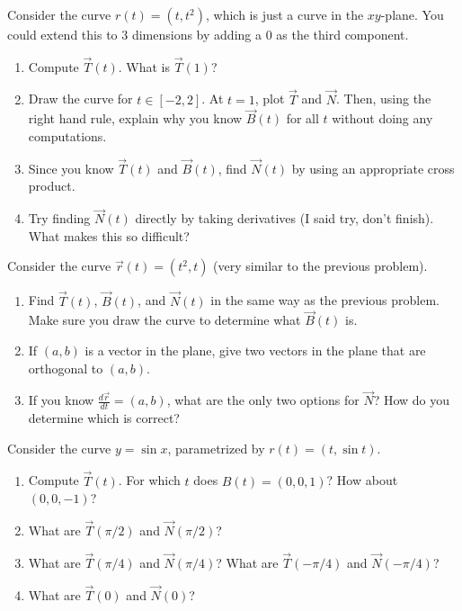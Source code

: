 \begin{problem}
 Consider the curve $r(t)=(t,t^2)$, which is just a curve in the $xy$-plane. You could extend this to 3 dimensions by adding a 0 as the third component.  
\begin{enumerate}
 \item Compute $\vec T(t)$.  What is $\vec T(1)$?
 \item Draw the curve for $t\in[-2,2]$.  At $t=1$, plot $\vec T$ and $\vec N$. Then, using the right hand rule, explain why you know $\vec B(t)$ for all $t$ without doing any computations.
 \item Since you know $\vec T(t)$ and $\vec B(t)$, find $\vec N(t)$ by using an appropriate cross product.
 \item Try finding $\vec N(t)$ directly by taking derivatives (I said try, don't finish).  What makes this so difficult?
\end{enumerate}
\end{problem}

\begin{problem}
 Consider the curve $\vec r(t)=(t^2,t)$ (very similar to the previous problem).
\begin{enumerate}
 \item Find $\vec T(t)$, $\vec B(t)$, and $\vec N(t)$ in the same way as the previous problem. Make sure you draw the curve to determine what $\vec B(t)$ is.
 \item If $(a,b)$ is a vector in the plane, give two vectors in the plane that are orthogonal to $(a,b)$.
 \item If you know $\frac{d\vec r}{dt}=(a,b)$, what are the only two options for $\vec N$?  How do you determine which is correct?
\end{enumerate}
\end{problem}

\begin{problem}
 Consider the curve $y=\sin x$, parametrized by $r(t)=(t,\sin t)$. 
\begin{enumerate}
 \item Compute $\vec T(t)$. For which $t$ does $B(t)=(0,0,1)$? How about $(0,0,-1)$?
 \item What are $\vec T(\pi/2)$ and $\vec N(\pi/2)$?
 \item What are $\vec T(\pi/4)$ and $\vec N(\pi/4)$? What are $\vec T(-\pi/4)$ and $\vec N(-\pi/4)$?
 \item What are $\vec T(0)$ and $\vec N(0)$?
\end{enumerate}
\end{problem}




